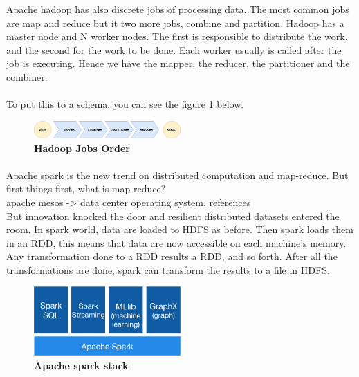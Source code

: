 Apache hadoop has also discrete jobs of processing data. The most common jobs are map and reduce but it two more jobs, combine and partition. Hadoop has a master node and N worker nodes. The first is responsible to distribute the work, and the second for the work to be done. Each worker usually is called after the job is executing. Hence we have the mapper, the reducer, the partitioner and the combiner.
\paragraph{} To put this to a schema, you can see the figure \ref{hadoopJobsOrder} below.


\begin{figure}[h]
	\centering
	\includegraphics[width=0.5\textwidth]{images/HadoopMapReduceProcesses.png}
	\caption{\bfseries Hadoop Jobs Order}
	\label{hadoopJobsOrder}
\end{figure}

\paragraph{}Apache spark is the new trend on distributed computation and map-reduce. 
But first things first, what is map-reduce? \\
apache mesos -> data center operating system, references
\\
But innovation knocked the door and resilient distributed datasets entered the room. In spark world, data are loaded to HDFS as before. Then spark loads them in an RDD, this means that data are now accessible on each machine's memory. Any transformation done to a RDD results a RDD, and so forth. After all the transformations are done, spark can transform the results to a file in HDFS.

\begin{figure}[ht]
  \centering
    \includegraphics[width=0.5\textwidth]{images/spark-stack.png}
    \caption{\bfseries Apache spark stack \cite{ApacheSpark:1}}
   \label{apacheSparkStack}
\end{figure}


